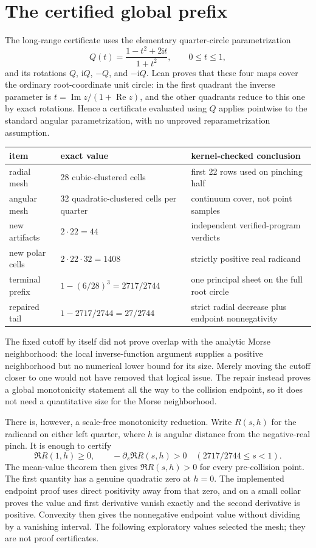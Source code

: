 \documentclass[11pt]{article}
\newcommand{\re}{\operatorname{Re}}
\newcommand{\impart}{\operatorname{Im}}
\newcommand{\ii}{\mathrm i}
\begin{document}
\section{The certified global prefix}

The long-range certificate uses the elementary quarter-circle parametrization
\[
 Q(t)=\frac{1-t^2+2\ii t}{1+t^2},\qquad 0\leq t\leq1,
\]
and its rotations $Q$, $\ii Q$, $-Q$, and $-\ii Q$.  Lean proves that these four maps cover the
ordinary root-coordinate unit circle: in the first quadrant the inverse parameter is
$t=\impart z/(1+\re z)$, and the other quadrants reduce to this one by exact rotations.  Hence a
certificate evaluated using $Q$ applies pointwise to the standard angular parametrization, with
no unproved reparametrization assumption.

\begin{center}
\begin{tabular}{lll}
\toprule
item & exact value & kernel-checked conclusion\\
\midrule
radial mesh & 28 cubic-clustered cells & first 22 rows used on pinching half\\
angular mesh & 32 quadratic-clustered cells per quarter & continuum cover, not point samples\\
new artifacts & $2\cdot22=44$ & independent verified-program verdicts\\
new polar cells & $2\cdot22\cdot32=1408$ & strictly positive real radicand\\
terminal prefix & $1-(6/28)^3=2717/2744$ & one principal sheet on the full root circle\\
repaired tail & $1-2717/2744=27/2744$ & strict radial decrease plus endpoint nonnegativity\\
\bottomrule
\end{tabular}
\end{center}

The fixed cutoff by itself did not prove overlap with the analytic Morse neighborhood: the local
inverse-function argument supplies a positive neighborhood but no numerical lower bound for its
size.  Merely moving the cutoff closer to one would not have removed that logical issue.  The
repair instead proves a global monotonicity statement all the way to the collision endpoint, so
it does not need a quantitative size for the Morse neighborhood.

There is, however, a scale-free monotonicity reduction.  Write $R(s,h)$ for the radicand on
either left quarter, where $h$ is angular distance from the negative-real pinch.  It is enough to
certify
\[
  \Re R(1,h)\geq0,
  \qquad -\partial_s\Re R(s,h)>0
  \quad(2717/2744\leq s<1).
\]
The mean-value theorem then gives $\Re R(s,h)>0$ for every pre-collision point.  The first
quantity has a genuine quadratic zero at $h=0$.  The implemented endpoint proof uses direct
positivity away from that zero, and on a small collar proves the value and first derivative
vanish exactly and the second derivative is positive.  Convexity then gives the nonnegative
endpoint value without dividing by a vanishing interval.  The following exploratory values
selected the mesh; they are not proof certificates.
\end{document}

